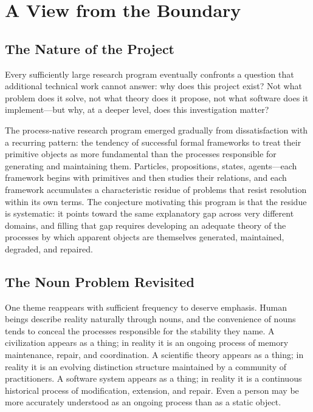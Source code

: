 \documentclass[11pt, oneside]{book}
\theoremstyle{definition}
\theoremstyle{remark}
\begin{document}
\chapter{A View from the Boundary}

\section{The Nature of the Project}

Every sufficiently large research program eventually confronts a question that additional technical work cannot answer: why does this project exist? Not what problem does it solve, not what theory does it propose, not what software does it implement—but why, at a deeper level, does this investigation matter?

The process-native research program emerged gradually from dissatisfaction with a recurring pattern: the tendency of successful formal frameworks to treat their primitive objects as more fundamental than the processes responsible for generating and maintaining them. Particles, propositions, states, agents—each framework begins with primitives and then studies their relations, and each framework accumulates a characteristic residue of problems that resist resolution within its own terms. The conjecture motivating this program is that the residue is systematic: it points toward the same explanatory gap across very different domains, and filling that gap requires developing an adequate theory of the processes by which apparent objects are themselves generated, maintained, degraded, and repaired.

\section{The Noun Problem Revisited}

One theme reappears with sufficient frequency to deserve emphasis. Human beings describe reality naturally through nouns, and the convenience of nouns tends to conceal the processes responsible for the stability they name. A civilization appears as a thing; in reality it is an ongoing process of memory maintenance, repair, and coordination. A scientific theory appears as a thing; in reality it is an evolving distinction structure maintained by a community of practitioners. A software system appears as a thing; in reality it is a continuous historical process of modification, extension, and repair. Even a person may be more accurately understood as an ongoing process than as a static object.
\end{document}
